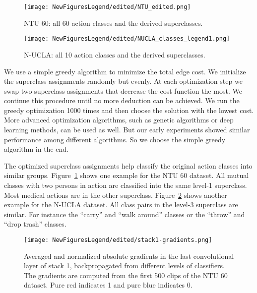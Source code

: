\documentclass{article}
\begin{document}
\begin{figure}[tbh]
\centering
\texttt{[image: NewFiguresLegend/edited/NTU\_edited.png]}
\caption{NTU 60: all 60 action classes and the derived superclasses. }
\label{fig:ntu_classes}
\end{figure}

\begin{figure}[tbh]
\centering
\texttt{[image: NewFiguresLegend/edited/NUCLA\_classes\_legend1.png]}
\caption{N-UCLA: all 10 action classes and the derived superclasses.}
\label{fig:nucla_classes}
\end{figure}

{We use a simple greedy algorithm to minimize the total edge cost. We initialize the superclass assignments randomly but evenly. At each optimization step we swap two superclass assignments that decrease the cost function the most. We continue this procedure until no more deduction can be achieved. We run the greedy optimization 1000 times and then choose the solution with the lowest cost. More advanced optimization algorithms, such as genetic algorithms or deep learning methods, can be used as well. But our early experiments showed similar performance among different algorithms. So we choose the simple greedy algorithm in the end.}

{The optimized superclass assignments help classify the original action classes into similar groups. Figure~\ref{fig:ntu_classes} shows one example for the NTU 60 dataset. All mutual classes with two persons in action are classified into the same level-1 superclass. Most medical actions are in the other superclass. Figure~\ref{fig:nucla_classes} shows another example for the N-UCLA dataset. All class pairs in the level-3 superclass are similar. For instance the ``carry'' and ``walk around'' classes or the ``throw'' and ``drop trash'' classes.}

\begin{figure}[tbh]
\centering
\texttt{[image: NewFiguresLegend/edited/stack1-gradients.png]}
\caption{Averaged and normalized absolute gradients in the last convolutional layer of stack 1, backpropagated from different levels of classifiers. The gradients are computed from the first 500 clips of the NTU 60 dataset. Pure red indicates 1 and pure blue indicates 0.}
\label{fig:level-1gradients}
\end{figure}
\end{document}
